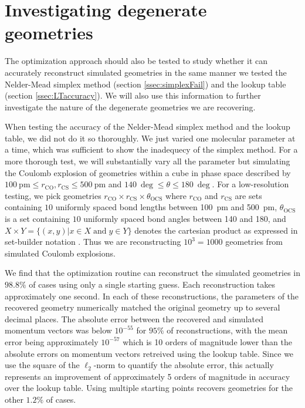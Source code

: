 \section{Investigating degenerate geometries}
The optimization approach should also be tested to study whether it can accurately reconstruct simulated geometries in the same manner we tested the Nelder-Mead simplex method (section \ref{ssec:simplexFail}) and the lookup table (section \ref{ssec:LTaccuracy}). We will also use this information to further investigate the nature of the degenerate geometries we are recovering.

When testing the accuracy of the Nelder-Mead simplex method and the lookup table, we did not do it so thoroughly. We just varied one molecular parameter at a time, which was sufficient to show the inadequecy of the simplex method. For a more thorough test, we will substantially vary all the parameter but simulating the Coulomb explosion of geometries within a cube in phase space described by $\SI{100}{\pico\meter} \le r_\mathrm{CO}, r_\mathrm{CS} \le \SI{500}{\pico\meter}$ and $\SI{140}{\deg} \le \theta \le \SI{180}{\deg}$. For a low-resolution testing, we pick geometries $r_\mathrm{CO} \times r_\mathrm{CS} \times \theta_\mathrm{OCS}$ where $r_\mathrm{CO}$ and $r_\mathrm{CS}$ are sets containing $10$ uniformly spaced bond lengths between \SI{100}{\pico\meter} and \SI{500}{\pico\meter}, $\theta_\mathrm{OCS}$ is a set containing $10$ uniformly spaced bond angles between \SI{140}{\deg} and \SI{180}{\deg}, and $X \times Y = \lbrace (x,y) | x \in X \;\mathrm{and}\; y \in Y \rbrace$ denotes the cartesian product as expressed in set-builder notation \citep[p. 6]{Warner90}. Thus we are reconstructing $10^3 = 1000$ geometries from simulated Coulomb explosions.

We find that the optimization routine can reconstruct the simulated geometries in $98.8\%$ of cases using only a single starting guess. Each reconstruction takes approximately one second. In each of these reconstructions, the parameters of the recovered geometry numerically matched the original geometry up to several decimal places. The absolute error between the recovered and simulated momentum vectors was below $10^{-55}$ for $95\%$ of reconstructions, with the mean error being approximately $10^{-57}$ which is 10 orders of magnitude lower than the absolute errors on momentum vectors retreived using the lookup table. Since we use the square of the $\ell_2$-norm to quantify the absolute error, this actually represents an improvement of approximately 5 orders of magnitude in accuracy over the lookup table. Using multiple starting points recovers geometries for the other $1.2\%$ of cases.

